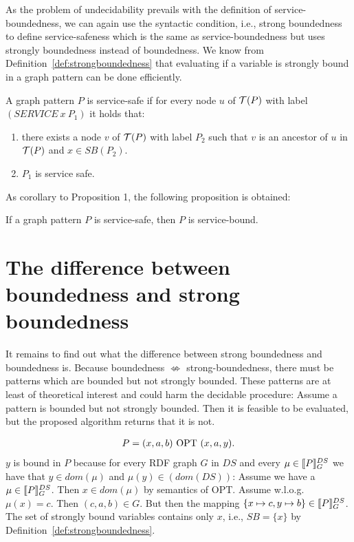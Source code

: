As the problem of undecidability prevails with the definition of
service-boundedness, we can again use the syntactic condition, i.e., strong boundedness to define
service-safeness which is the same as service-boundedness but uses strongly
boundedness instead of boundedness. We know from
Definition~\ref{def:strongboundedness} that evaluating if a variable is strongly
bound in a graph pattern can be done efficiently.

\begin{definition}
	A graph pattern $P$ is service-safe if for every node $u$ of $\mathcal{T}(P)$ with
	label $(SERVICE \ x \ P_1)$ it holds that:
	\begin{enumerate}
		\item there exists a node $v$ of $\mathcal{T}(P)$ with label $P_2$ such that $v$
			is an ancestor of $u$ in $\mathcal{T}(P)$ and $x \in SB(P_2)$.
		\item $P_1$ is service safe.
	\end{enumerate}
\end{definition}

As corollary to Proposition 1, the following proposition is obtained:
\begin{proposition}
	If a graph pattern $P$ is service-safe, then $P$ is service-bound.
\end{proposition}

\section{The difference between boundedness and strong boundedness}
It remains to find out what the difference between strong boundedness
and boundedness is. Because boundedness $\not \Leftrightarrow$ strong-boundedness, there
must be patterns which are bounded but not strongly bounded. These patterns are at least
of theoretical interest and could harm the decidable procedure:
Assume a pattern is bounded but not strongly bounded. Then it is feasible to be evaluated, 
but the proposed algorithm returns that it is not.

\begin{example}\label{bbutnotsbound}
	\begin{align*}
		P = (x,a, b) \mbox{ OPT } (x, a, y).
	\end{align*}
	$y$ is bound in $P$ because for every RDF graph $G$ in $DS$ and
	every $\mu \in \llbracket P \rrbracket^{DS}_G$ we have that $y \in dom(\mu)$ and
	$\mu(y) \in (dom(DS))$: Assume we have a $\mu \in \llbracket P \rrbracket^{DS}_G$. Then $x
	\in dom(\mu)$ by semantics of OPT. Assume w.l.o.g. $\mu(x) = c$. Then
	$(c,a, b) \in G$. But then the mapping $\{ x \mapsto c , y\mapsto b \}
	\in \llbracket P \rrbracket^{DS}_G$.
	The set of strongly bound variables contains
	only $x$, i.e., $SB = \{ x \}$ by Definition~\ref{def:strongboundedness}.
\end{example}

